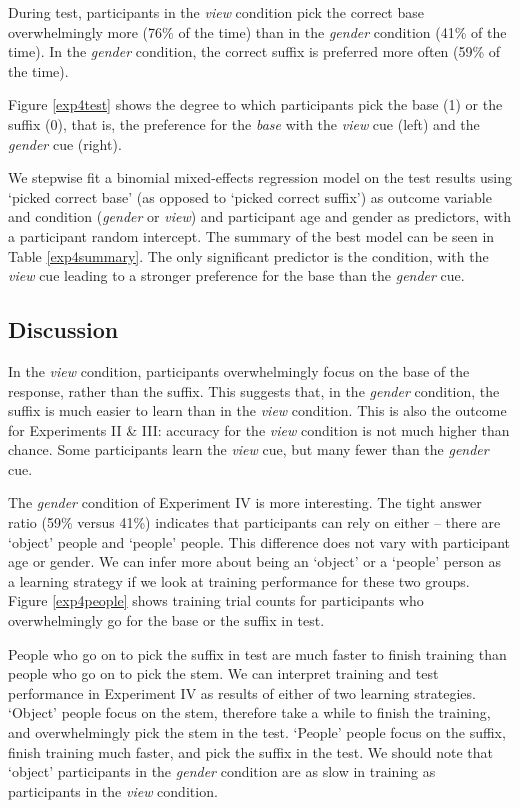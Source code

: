 \documentclass{frontiersSCNS} %
\begin{document}
During test, participants in the \emph{view} condition pick the correct base overwhelmingly more (76\% of the time) than in the \emph{gender} condition (41\% of the time).  In the \emph{gender} condition, the correct suffix is preferred more often (59\% of the time).

Figure \ref{exp4test} shows the degree to which participants pick the base (1) or the suffix (0), that is, the preference for the \emph{base} with the \emph{view} cue (left) and the \emph{gender} cue (right). 

We stepwise fit a binomial mixed-effects regression model on the test results using `picked correct base' (as opposed to `picked correct suffix') as outcome variable and condition (\emph{gender} or \emph{view}) and participant age and gender as predictors, with a participant random intercept. The summary of the best model can be seen in Table \ref{exp4summary}.   The only significant predictor is the condition, with the \emph{view} cue leading to a stronger preference for the base than the \emph{gender} cue. 

\subsection{Discussion}

In the \emph{view} condition, participants overwhelmingly focus on the base of the response, rather than the suffix. This suggests that, in the \emph{gender} condition, the suffix is much easier to learn than in the \emph{view} condition. This is also the outcome for Experiments II \& III: accuracy for the \emph{view} condition is not much higher than chance. Some participants learn the \emph{view} cue, but many fewer than the \emph{gender} cue.

The \emph{gender} condition of Experiment IV is more interesting. The tight answer ratio (59\% versus 41\%) indicates that participants can rely on either -- there are `object' people and `people' people. This difference does not vary with participant age or gender. We can infer more about being an `object' or a `people' person as a learning strategy if we look at training performance for these two groups. Figure \ref{exp4people} shows training trial counts for participants who overwhelmingly go for the base or the suffix in test.

People who go on to pick the suffix in test are much faster to finish training than people who go on to pick the stem. We can interpret training and test performance in Experiment IV as results of either of two learning strategies. `Object' people focus on the stem, therefore take a while to finish the training, and overwhelmingly pick the stem in the test. `People' people focus on the suffix, finish training much faster, and pick the suffix in the test. We should note that `object' participants in the \emph{gender} condition are as slow in training as participants in the \emph{view} condition. 
\end{document}
